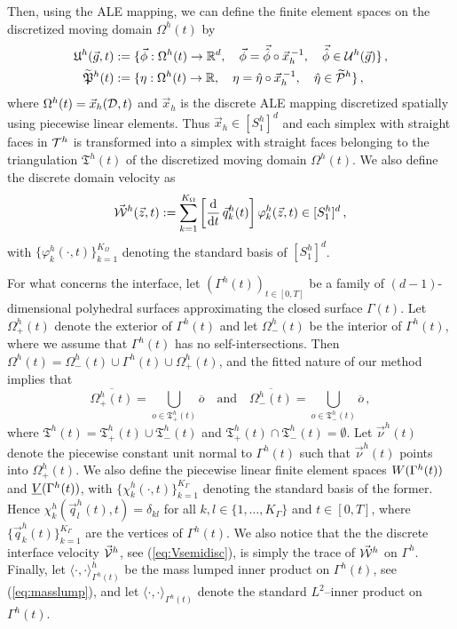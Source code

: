 Then, using the ALE mapping, we can define the finite element spaces on
the discretized moving domain $\Omega^h(t)$ by
\begin{align*}
\uspacesemidiscale{g}{h}{t} &:= \{ \vec\phi:
\Omega^h(t) \to \R^d,\quad
\vec \phi=\vec{\hat\phi}\circ\vec x_h^{\,-1},\quad\vec{\hat\phi}
\in\uspacesemidiscref{g}{h}\}\,,\\
\pnormspaceale^h(t) &:= \{ \eta: \Omega^h(t)\to \R,\quad
\eta=\hat\eta\circ\vec x_h^{\,-1},\quad\hat\eta\in\pnormspaceref^h \}\,,
\end{align*}
where $\Omega^h(t)=\vec x_h(\D,t)$ and $\vec x_h$ is the discrete ALE mapping
discretized spatially using piecewise linear elements. Thus
$\vec x_h\in [S^h_1]^d$ and each simplex with straight faces in ${\cal T}^h$ is
transformed into a simplex with straight faces belonging to the
triangulation $\mathfrak{T}^h(t)$ of the discretized moving domain
$\Omega^h(t)$. We also define the discrete domain velocity as
\begin{equation}
\W^h(\vec z, t):=
\sum_{k=1}^{K_\Omega}\left[\ddt\,\vec q^h_k(t)\right] \varphi^h_k(\vec z, t)
\in [S^h_1]^d\,,
\end{equation}
with $\{\varphi^h_k(\cdot,t)\}_{k=1}^{K_\Omega}$ denoting the standard basis of
$[S^h_1]^d$.

For what concerns the interface, let $(\Gamma^h(t))_{t\in[0,T]}$  be a family of
$(d-1)$-dimensional polyhedral surfaces approximating the closed surface
$\Gamma(t)$. Let $\Omega^h_+(t)$ denote the exterior of $\Gamma^h(t)$ and let
$\Omega^h_-(t)$ be the interior of $\Gamma^h(t)$, where we assume that
$\Gamma^h(t)$ has no self-intersections. Then $\Omega^h(t) = \Omega_-^h(t) \cup
\Gamma^h(t) \cup \Omega_+^h(t)$, and the fitted nature of our method implies
that
\begin{equation} \label{eq:fittedO_ale}
\overline{\Omega^h_+(t)} = \bigcup_{o \in \mathfrak{T}^h_+(t)} \overline{o}
\quad\text{and}\quad
\overline{\Omega^h_-(t)} = \bigcup_{o \in \mathfrak{T}^h_-(t)} \overline{o} \,,
\end{equation}
where $\mathfrak{T}^h(t) = \mathfrak{T}^h_+(t) \cup \mathfrak{T}^h_-(t)$ and
$\mathfrak{T}^h_+(t) \cap \mathfrak{T}^h_-(t) = \emptyset$.
Let $\vec \nu^h(t)$ denote the piecewise constant unit normal to $\Gamma^h(t)$
such that $\vec\nu^h(t)$ points into $\Omega^h_+(t)$. We also define the
piecewise linear finite element spaces $\Wht$ and $\Vht$, with
$\{\chi^h_k(\cdot,t)\}_{k=1}^{K_\Gamma}$ denoting the standard basis of the
former. Hence $\chi^h_k(\vec q^h_l(t),t) = \delta_{kl}$ for all
$k,l \in \{1,\ldots,K_\Gamma\}$ and $t \in [0,T]$, where
$\{\vec q^h_k(t)\}_{k=1}^{K_\Gamma}$ are the vertices of $\Gamma^h(t)$. We also
notice that the the discrete interface velocity $\V^h$, see
(\ref{eq:Vsemidisc}), is simply the trace of $\W^h$ on $\Gamma^h$. Finally, let
$\langle\cdot,\cdot\rangle_{\Gamma^h(t)}^h$ be the mass lumped inner product on
$\Gamma^h(t)$, see (\ref{eq:masslump}), and let
$\langle\cdot,\cdot\rangle_{\Gamma^h(t)}$ denote the standard $L^2$--inner
product on $\Gamma^h(t)$.

